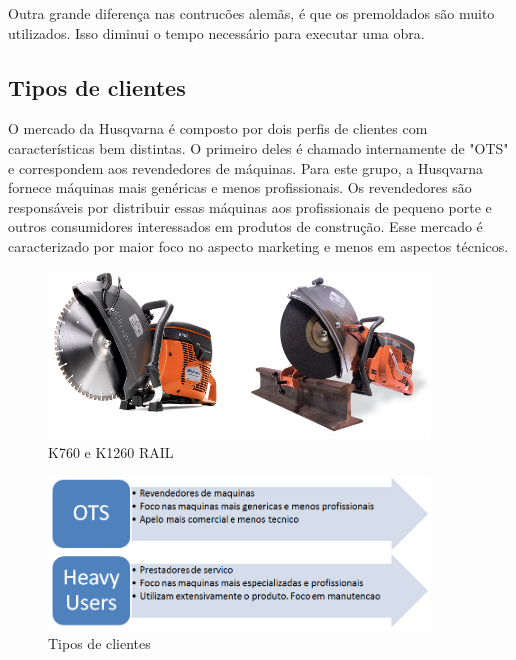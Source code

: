 \documentclass[12pt]{article}
\begin{document}
Outra grande diferença nas contrucões alemãs, é que os premoldados são muito utilizados. Isso diminui o tempo necessário para executar uma obra.

\subsection{Tipos de clientes}

	O mercado da Husqvarna é composto por dois perfis de clientes com características bem distintas. O primeiro deles é chamado internamente de "OTS" e correspondem aos revendedores de máquinas. Para este grupo, a Husqvarna fornece máquinas mais genéricas e menos profissionais. Os revendedores são responsáveis por distribuir essas máquinas aos profissionais de pequeno porte e outros consumidores interessados em produtos de construção. Esse mercado é caracterizado por maior foco no aspecto marketing e menos em aspectos técnicos.

\begin{figure}[h!]
	\centering
	\includegraphics[width=0.9\textwidth]{img/k760-vs-k1260rail.png}
	\caption{K760 e K1260 RAIL}
	\label{fig:k700vsk1260}
\end{figure}

\begin{figure}[h!]
	\centering
	\includegraphics[width=0.9\textwidth]{img/clientes.png}
	\caption{Tipos de clientes}
	\label{fig:tipo-clientes}
\end{figure}
\end{document}
